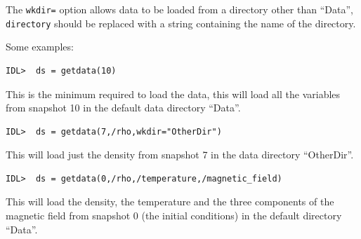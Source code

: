 \documentclass[11pt]{article}
\begin{document}
The \texttt{wkdir=} option allows data to be loaded from a directory other than ``Data'', \texttt{directory} should be replaced with a string containing the name of the directory.

Some examples:
\begin{verbatim}
IDL>  ds = getdata(10)
\end{verbatim}
This is the minimum required to load the data, this will load all the variables from snapshot 10 in the default data directory ``Data''.

\begin{verbatim}
IDL>  ds = getdata(7,/rho,wkdir="OtherDir")
\end{verbatim}
This will load just the density from snapshot 7 in the data directory ``OtherDir''.

\begin{verbatim}
IDL>  ds = getdata(0,/rho,/temperature,/magnetic_field)
\end{verbatim}
This will load the density, the temperature and the three components of the magnetic field from snapshot 0 (the initial conditions) in the default directory ``Data''.
\end{document}
